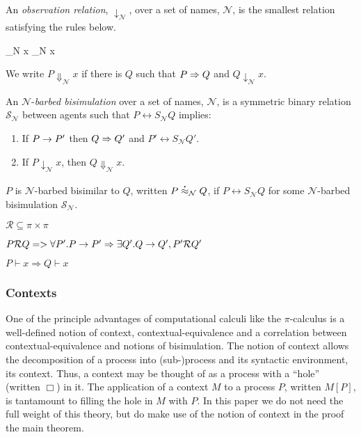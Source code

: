 \documentclass[12pt]{llncs}
\begin{document}
\begin{definition}
An \emph{observation relation}, $\downarrow_{\mathcal N}$, over a set
of names, $\mathcal N$, is the smallest relation satisfying the rules
below.

		  { \downarrow_{\mathcal N} x}
		  { \downarrow_{\mathcal N} x}

We write $P \Downarrow_{\mathcal N} x$ if there is $Q$ such that 
$P \Rightarrow Q$ and $Q \downarrow_{\mathcal N} x$.
\end{definition}

\begin{definition}
An  ${\mathcal N}$-\emph{barbed bisimulation} over a set of names, ${\mathcal N}$, is a symmetric binary relation 
${\mathcal S}_{\mathcal N}$ between agents such that $P\rel{S}_{\mathcal N}Q$ implies:
\begin{enumerate}
\item If $P \rightarrow P'$ then $Q \Rightarrow Q'$ and $P'\rel{S}_{\mathcal N} Q'$.
\item If $P\downarrow_{\mathcal N} x$, then $Q\Downarrow_{\mathcal N} x$.
\end{enumerate}
$P$ is ${\mathcal N}$-barbed bisimilar to $Q$, written
$P \stackrel{\centerdot}{\approx}_{\mathcal N} Q$, if $P \rel{S}_{\mathcal N} Q$ for some ${\mathcal N}$-barbed bisimulation ${\mathcal S}_{\mathcal N}$.
\end{definition}

$\mathcal{R} \subseteq \pi \times \pi$

$P \mathcal{R} Q => \forall P'. P \rightarrow P' \Rightarrow \exists Q'. Q \rightarrow Q', P' \mathcal{R} Q'$

$P \vdash x \Rightarrow Q \vdash x$


\subsubsection{Contexts}

One of the principle advantages of computational calculi like the
$\pi$-calculus is a well-defined notion of context,
contextual-equivalence and a correlation between
contextual-equivalence and notions of bisimulation. The notion of
context allows the decomposition of a process into (sub-)process and
its syntactic environment, its context. Thus, a context may be
thought of as a process with a ``hole'' (written $\Box$) in it. The
application of a context $M$ to a process $P$, written $M[P]$, is
tantamount to filling the hole in $M$ with $P$. In this paper we do
not need the full weight of this theory, but do make use of the notion
of context in the proof the main theorem. 
\end{document}
